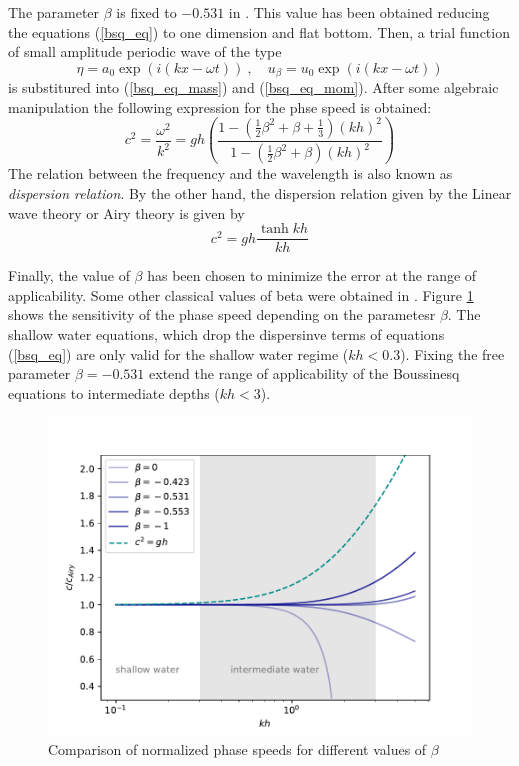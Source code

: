 The parameter $\beta$ is fixed to $-0.531$ in \cite{nwogu1993}. This value has been obtained reducing the equations (\ref{bsq_eq}) to one dimension and flat bottom. Then, a trial function of small amplitude periodic wave of the type
\begin{equation*}
    \eta = a_0 \exp(i(kx-\omega t)) \ , \quad u_\beta = u_0 \exp(i(kx-\omega t))
\end{equation*}
is substitured into (\ref{bsq_eq_mass}) and (\ref{bsq_eq_mom}). After some algebraic manipulation the following expression for the phse speed is obtained:
\begin{equation}
c^2 = \frac{\omega^2}{k^2} = gh
    \left(\frac{
        1-\left(\frac{1}{2}\beta^2 + \beta + \frac{1}{3}\right)(kh)^2
    }{
        1-\left(\frac{1}{2}\beta^2 + \beta\right)(kh)^2
    }\right)
\end{equation}
The relation between the frequency and the wavelength is also known as \emph{dispersion relation}.
By the other hand, the dispersion relation given by the Linear wave theory or Airy theory is given by
\begin{equation}
c^2 = gh \frac{\tanh kh}{kh}
\end{equation}

Finally, the value of $\beta$ has been chosen to minimize the error at the range of applicability. Some other classical values of beta were obtained in \cite{madsen1991,murray1989}. Figure \ref{phase_speed_beta} shows the sensitivity of the phase speed depending on the parametesr $\beta$. The shallow water equations, which drop the dispersinve terms of equations (\ref{bsq_eq}) are only valid for the shallow water regime ($kh<0.3$). Fixing the free parameter $\beta=-0.531$ extend the range of applicability of the Boussinesq equations to intermediate depths ($kh<3$).

\begin{figure}
    \centering
    \includegraphics[width=.8\textwidth]{img/dispersion_beta.pdf}
    \caption{Comparison of normalized phase speeds for different values of $\beta$}
    \label{phase_speed_beta}
\end{figure}

